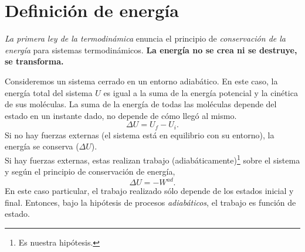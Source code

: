 \documentclass[openany]{book}
\begin{document}
\section{Definición de energía}
\emph{La primera ley de la termodinámica} enuncia el principio de \emph{conservación de la energía} para sistemas termodinámicos. \textbf{La energía no se crea ni se destruye, se transforma.}\par
Consideremos un sistema cerrado en un entorno adiabático. En este caso, la energía total del sistema $U$ es igual a la suma de la energía potencial y la cinética de sus moléculas. La suma de la energía de todas las moléculas depende del estado en un instante dado, no depende de cómo llegó al mismo.
\begin{equation*}
	\Delta U=U_f-U_i.
\end{equation*}
Si no hay fuerzas externas (el sistema está en equilibrio con su entorno), la energía se conserva ($ \Delta U $).\\
Si hay fuerzas externas, estas realizan trabajo (adiabáticamente)\footnote{Es nuestra hipótesis.} sobre el sistema y según el principio de conservación de energía,
\begin{equation}
	\Delta U=-W^{ad}.
\end{equation}
En este caso particular, el trabajo realizado sólo depende de los estados inicial y final. Entonces, bajo la hipótesis de procesos \emph{adiabáticos}, el trabajo es función de estado.
\end{document}
